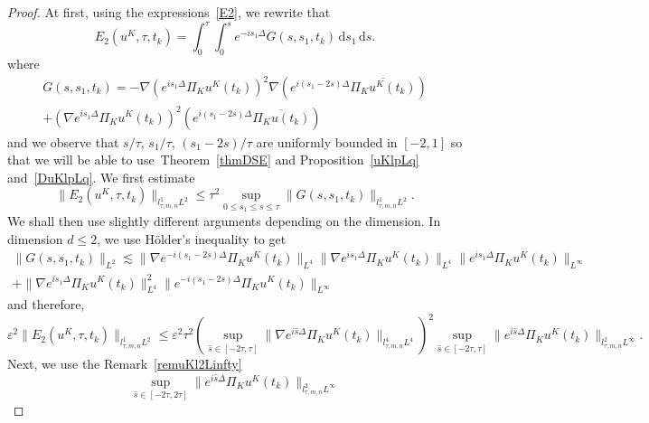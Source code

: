 \documentclass[10pt,a4paper]{article}
\begin{document}
  \begin{proof}
    At first, using the expressions~\eqref{E2}, we rewrite that
    \begin{equation}%
      E_2(u^K,\tau,t_k) = \int_0^\tau \int_0^s e^{-is_1\Delta} G(s,s_1,t_k)\,\mathrm{d}s_1\,\mathrm{d}s.
    \end{equation}
    where
    \begin{multline*}
      G(s,s_1,t_k) =  -\nabla\left( e^{is_1\Delta} \Pi_K u^K(t_k) \right)^2 
      \nabla \left( e^{i(s_1-2s)\Delta} \overline{\Pi_K u^K(t_k)} \right) \\
      + \left( \nabla e^{is_1\Delta} \Pi_K u^K(t_k) \right)^2 \left( e^{i(s_1-2s)\Delta} \overline{\Pi_K u(t_k)} \right)
    \end{multline*}
    and we observe that \(s/\tau\), \(s_1/\tau\), \((s_1- 2s)/\tau\) are uniformly
    bounded in \([-2, 1]\) so that we will be able to use~Theorem~\ref{thmDSE}
    and Proposition~\ref{uKlpLq} and~\ref{DuKlpLq}.
    We first estimate
    \begin{equation}%
      \|E_2(u^K,\tau,t_k)\|_{l^1_{\tau,m,n}L^2} \leq \tau^2  
      \sup_{0 \leq s_1 \leq s \leq \tau} \|G(s, s_1, t_k)\|_{l^1_{\tau,m,n}L^2}.
    \end{equation}
    We shall then use slightly different arguments depending on the dimension.
    In dimension \(d \leq 2\), we use H\"older's inequality to get
    \begin{multline*}
      \|G(s,s_1,t_k)\|_{L^2} \lesssim  \|\nabla e^{-i(s_1-2s)\Delta}\Pi_{K}u^K(t_k)\|_{L^4} 
      \|\nabla e^{is_1\Delta} \Pi_{K}u^K(t_k)\|_{L^4}
      \|e^{is_1\Delta}\Pi_{K}u^K(t_k)\|_{L^\infty}  \\
      + \|\nabla e^{is_1\Delta}\Pi_{K}u^K(t_k)\|_{L^4}^2 \|e^{-i(s_1-2s)\Delta}\Pi_{K}u^K(t_k)\|_{L^\infty}
    \end{multline*}
    and therefore,
    \begin{equation}\label{F2lpLq}
      \varepsilon^2 \|E_2(u^K,\tau,t_k)\|_{l^1_{\tau,m,n}L^2} \leq  
      \varepsilon^2 \tau^2
      \left(\sup_{\hat{s} \in [-2\tau,\tau]}  
      \|\nabla e^{i\hat{s}\Delta}\Pi_K u^K(t_k)\|_{l^4_{\tau,m,n}L^4}  \right)^2 
      \sup_{\hat s \in [-2\tau, \tau]} \|e^{i\hat{s}\Delta}\Pi_K u^K(t_k)\|_{l^2_{\tau,m,n}L^\infty}.
    \end{equation}
    Next, we use the Remark~\ref{remuKl2Linfty}
    \begin{equation}\label{expuKl2Linfty}
      \sup_{\hat s \in [-2\tau, 2\tau]} \|e^{i\hat s\Delta}\Pi_{K} u^K(t_{k})\|_{l^2_{\tau,m,n}L^\infty} 

\end{equation}
\end{proof}
\end{document}
